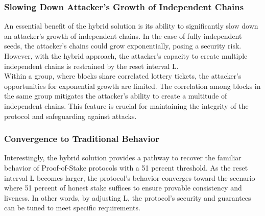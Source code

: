 \subsubsection{Slowing Down Attacker's Growth of Independent Chains}
An essential benefit of the hybrid solution is its ability to significantly slow down an attacker's growth of independent chains. In the case of fully independent seeds, the attacker's chains could grow exponentially, posing a security risk. However, with the hybrid approach, the attacker's capacity to create multiple independent chains is restrained by the reset interval L.\\
Within a group, where blocks share correlated lottery tickets, the attacker's opportunities for exponential growth are limited. The correlation among blocks in the same group mitigates the attacker's ability to create a multitude of independent chains. This feature is crucial for maintaining the integrity of the protocol and safeguarding against attacks.

\subsubsection{Convergence to Traditional Behavior}
Interestingly, the hybrid solution provides a pathway to recover the familiar behavior of Proof-of-Stake protocols with a 51 percent threshold. As the reset interval L becomes larger, the protocol's behavior converges toward the scenario where 51 percent of honest stake suffices to ensure provable consistency and liveness. In other words, by adjusting L, the protocol's security and guarantees can be tuned to meet specific requirements.

